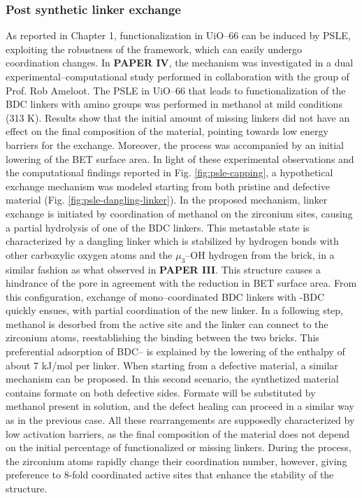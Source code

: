 \subsubsection*{Post synthetic linker exchange}
As reported in Chapter 1, functionalization in UiO--66 can be induced by PSLE, exploiting the robustness of the framework, which can easily undergo coordination changes. In \textbf{PAPER IV}, the mechanism was investigated in a dual experimental--computational study performed in collaboration with the group of Prof. Rob Ameloot. The PSLE in UiO--66 that leads to functionalization of the BDC linkers with amino groups was performed in methanol at mild conditions (313 K). Results show that the initial amount of missing linkers did not have an effect on the final composition of the material, pointing towards low energy barriers for the exchange. Moreover, the process was accompanied by an initial lowering of the BET surface area. 
\npar
In light of these experimental observations and the computational findings reported in Fig. \ref{fig:psle-capping}, a hypothetical exchange mechanism was modeled starting from both pristine and defective material (Fig. \ref{fig:psle-dangling-linker}). In the proposed mechanism, linker exchange is initiated by coordination of methanol on the zirconium sites, causing a partial hydrolysis of one of the BDC linkers. This metastable state is characterized by a dangling linker which is stabilized by hydrogen bonds with other carboxylic oxygen atoms and the $\mu_3$--OH hydrogen from the brick, in a similar fashion as what observed in \textbf{PAPER III}. This structure causes a hindrance of the pore in agreement with the reduction in BET surface area. From this configuration, exchange of mono--coordinated BDC linkers with -BDC quickly ensues, with partial coordination of the new linker. In a following step, methanol is desorbed from the active site and the linker can connect to the zirconium atoms, reestablishing the binding between the two bricks. This preferential adsorption of BDC-- is explained by the lowering of the enthalpy of about 7 kJ/mol per linker. When starting from a defective material, a similar mechanism can be proposed. In this second scenario, the synthetized material contains formate on both defective sides. Formate will be substituted by methanol present in solution, and the defect healing can proceed in a similar way as in the previous case. All these rearrangements are supposedly characterized by low activation barriers, as the final composition of the material does not depend on the initial percentage of functionalized or missing linkers. During the process, the zirconium atoms rapidly change their coordination number, however, giving preference to 8-fold coordinated active sites that enhance the stability of the structure. 


